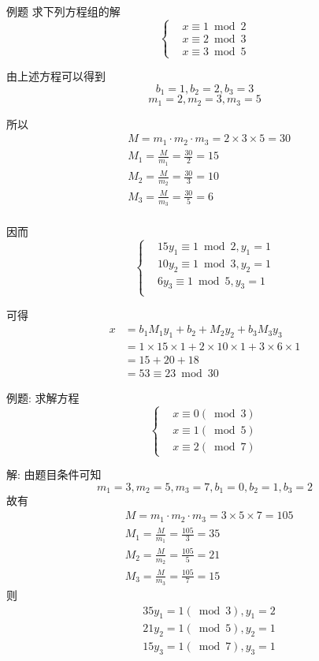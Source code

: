 \documentclass[UTF8]{ctexart}
\begin{document}
    例题 求下列方程组的解
    $$
    \left\{ \begin{aligned}
        &x\equiv 1\bmod 2\\
        &x\equiv 2\bmod 3\\
        &x\equiv 3\bmod 5
    \end{aligned}\right.
    $$

    由上述方程可以得到
    $$b_1=1, b_2=2, b_3=3$$
    $$m_1=2, m_2=3, m_3=5$$

    所以
    $$
    \begin{aligned}
        &M=m_1\cdot m_2\cdot m_3=2\times 3\times 5=30\\
        &M_1=\frac{M}{m_1}=\frac{30}{2}=15\\
        &M_2=\frac{M}{m_2}=\frac{30}{3}=10\\
        &M_3=\frac{M}{m_3}=\frac{30}{5}=6\\
    \end{aligned}
    $$

    因而
    $$
    \left\{ \begin{aligned}
        &15y_1\equiv 1\bmod 2, y_1=1\\
        &10y_2\equiv 1\bmod 3, y_2=1\\
        &6y_3\equiv 1\bmod 5, y_3=1\\
    \end{aligned}\right.
    $$

    可得
    $$
    \begin{aligned}
        x&=b_1M_1y_1+b_2+M_2y_2+b_3M_3y_3\\
         &=1\times 15\times 1+2\times 10\times  1+3\times 6\times 1\\
         &=15+20+18\\
         &=53\equiv 23\bmod 30
    \end{aligned}
    $$

    例题: 求解方程
    $$
    \left\{ \begin{aligned}
        &x\equiv 0(\bmod 3)\\
        &x\equiv 1(\bmod 5)\\
        &x\equiv 2(\bmod 7)
    \end{aligned}\right.
    $$

    解: 由题目条件可知
    $$m_1=3, m_2=5, m_3=7, b_1=0, b_2=1, b_3=2$$
    故有
    $$
    \begin{aligned}
        &M=m_1\cdot m_2\cdot m_3=3\times 5\times 7=105\\
        &M_1=\frac{M}{m_1}=\frac{105}{3}=35\\
        &M_2=\frac{M}{m_2}=\frac{105}{5}=21\\
        &M_3=\frac{M}{m_3}=\frac{105}{7}=15
    \end{aligned}
    $$
    则
    $$
    \begin{aligned}
        &35y_1=1(\bmod 3), y_1=2\\
        &21y_2=1(\bmod 5), y_2=1\\
        &15y_3=1(\bmod 7), y_3=1
    \end{aligned}
    $$
\end{document}
